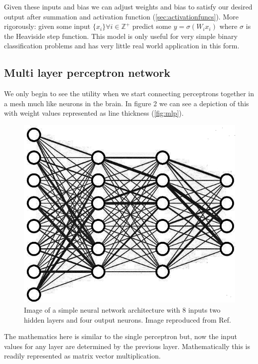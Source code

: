 \documentclass{article}
\begin{document}
Given these inputs and bias we can adjust weights and bias to satisfy our desired output after summation and activation function (\ref{sec:activationfuncs}). 
More rigorously: given some input $\{x_i\} \forall i\in \mathbb{Z^+}$ predict some $y=\sigma(W_i x_i)$ where $\sigma$ is the Heaviside step function. This model is only useful for very simple binary classification problems and has very little real world application in this form.

\pagebreak

\subsection{Multi layer perceptron network}
\label{sec:mlp}
We only begin to see the utility when we start connecting perceptrons together in a mesh much like neurons in the brain. In figure 2 we can see a depiction of this with weight values represented as line thickness (\autoref{fig:mlp}). 
\begin{figure}[H]
\caption{Image of a simple neural network architecture with 8 inputs two hidden layers and four output neurons. Image reproduced from Ref.\cite{3blue1brown}}
\label{fig:mlp}
\includegraphics[scale=2]{nn.jpg}
\end{figure}
The mathematics here is similar to the single perceptron but, now the input values for any layer are determined by the previous layer. Mathematically this is readily represented as matrix vector multiplication. 
\end{document}
